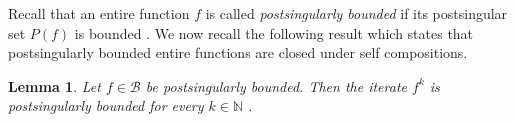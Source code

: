 \documentclass[a4paper,12pt]{amsart}
\numberwithin{equation}{section}
\newtheorem{lemma}[theorem]{Lemma}
\newtheorem{definition}[theorem]{Definition}
\begin{document}
	Recall that an entire function $f$ is called \emph{postsingularly bounded} if its
	postsingular set $P(f)$ is bounded \cite{kumar2014escaping}.
%	
%	
	 We now recall the following result which states that postsingularly bounded entire functions are closed under self compositions.
	
	\begin{lemma} \label{l 1}
		Let $f \in \mathcal{B}$ be postsingularly bounded. Then the iterate
		$f^{k}$ is postsingularly bounded for every $k \in \mathbb{N}$ \cite[Lemma 3.7]{kumar2016dynamics}.
	\end{lemma}
	
\end{document}
